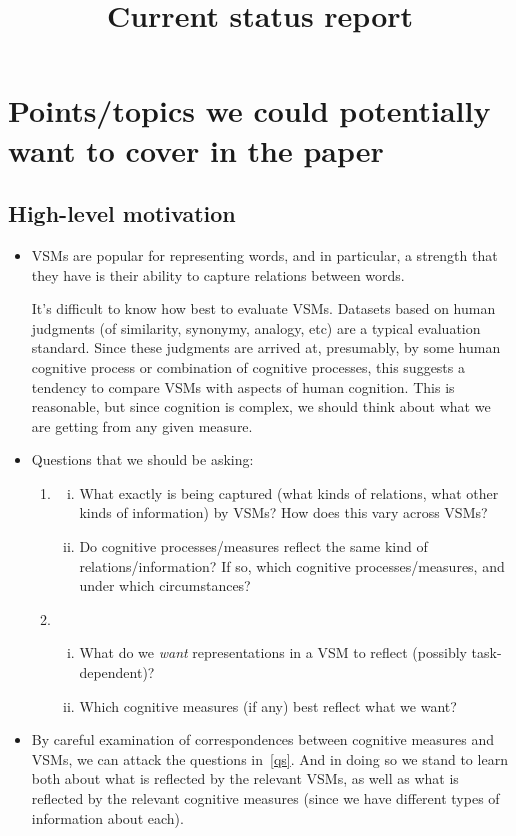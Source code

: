 \documentclass{article}
\title{Current status report}
\date{}
\begin{document}
\maketitle
\tableofcontents

\section{Points/topics we could potentially want to cover in the paper}

\subsection{High-level motivation}
\begin{itemize}
\item VSMs are popular for representing words, and in particular, a strength that they have is their ability to capture relations between words. 

It's difficult to know how best to evaluate VSMs. Datasets based on human judgments (of similarity, synonymy, analogy, etc) are a typical evaluation standard. Since these judgments are arrived at, presumably,  by some human cognitive process or combination of cognitive processes, this suggests a tendency to compare VSMs with aspects of human cognition. This is reasonable, but since cognition is complex, we should think about what we are getting from any given measure. 
\item Questions that we should be asking: 
\begin{enumerate}[1)]
\item\label{qs} \begin{enumerate}[i.]
\item What exactly is being captured (what kinds of relations, what other kinds of information) by VSMs? How does this vary across VSMs? 
\item Do cognitive processes/measures reflect the same kind of relations/information? If so, which cognitive processes/measures, and under which circumstances? 
\end{enumerate}
\item \begin{enumerate}[i.]
\item What do we \emph{want} representations in a VSM to reflect (possibly task-dependent)?
\item Which cognitive measures (if any) best reflect what we want?
\end{enumerate}
\end{enumerate}
\item By careful examination of correspondences between cognitive measures and VSMs, we can attack the questions in~\ref{qs}. And in doing so we stand to learn both about what is reflected by the relevant VSMs, as well as what is reflected by the relevant cognitive measures (since we have different types of information about each). 


\end{itemize}
\end{document}
